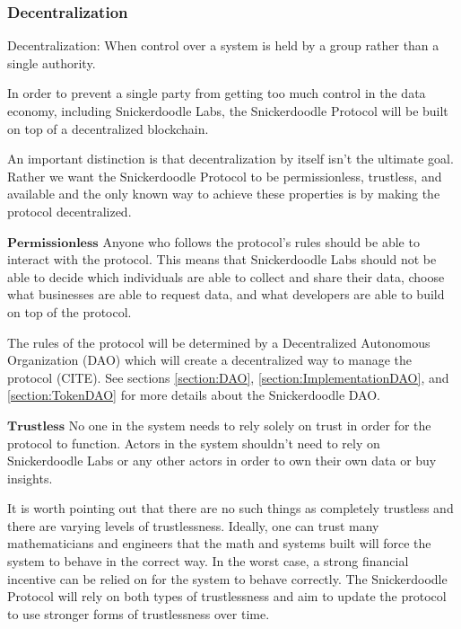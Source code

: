 \subsubsection{Decentralization}
\begin{definition}
\label{definition:Decentralization}
Decentralization: When control over a system is held by a group rather than a single authority.
\end{definition}

In order to prevent a single party from getting too much control in the data economy, including Snickerdoodle Labs, the Snickerdoodle Protocol will be built on top of a decentralized blockchain. 

An important distinction is that decentralization by itself isn't the ultimate goal. Rather we want the Snickerdoodle Protocol to be permissionless, trustless, and available and the only known way to achieve these properties is by making the protocol decentralized.

$\mathbf{Permissionless}$
Anyone who follows the protocol's rules should be able to interact with the protocol. This means that Snickerdoodle Labs should not be able to decide which individuals are able to collect and share their data, choose what businesses are able to request data, and what developers are able to build on top of the protocol. 

The rules of the protocol will be determined by a Decentralized Autonomous Organization (DAO) which will create a decentralized way to manage the protocol (CITE). See sections \ref{section:DAO}, \ref{section:ImplementationDAO}, and \ref{section:TokenDAO} for more details about the Snickerdoodle DAO.

$\mathbf{Trustless}$
No one in the system needs to rely solely on trust in order for the protocol to function.  Actors in the system shouldn't need to rely on Snickerdoodle Labs or any other actors in order to own their own data or buy insights.

It is worth pointing out that there are no such things as completely trustless and there are varying levels of trustlessness. Ideally, one can trust many mathematicians and engineers that the math and systems built will force the system to behave in the correct way. In the worst case, a strong financial incentive can be relied on for the system to behave correctly. The Snickerdoodle Protocol will rely on both types of trustlessness and aim to update the protocol to use stronger forms of trustlessness over time.

